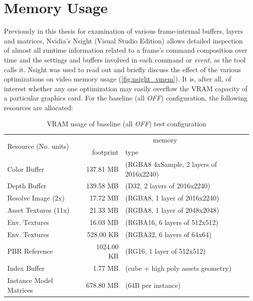 
\section{Memory Usage}
Previously in this thesis for examination of various frame-internal buffers, layers and matrices, Nvidia's Nsight (Visual Studio Edition) allows detailed inspection of almost all runtime information related to a frame's command composition over time and the settings and buffers involved in each command or \textit{event}, as the tool calls it. Nsight was used to read out and briefly discuss the effect of the various optimizations on video memory usage (\autoref{fig:nsight_vmem}). It is, after all, of interest whether any one optimization may easily overflow the VRAM capacity of a particular graphics card. 
For the baseline (all \textit{OFF}) configuration, the following resources are allocated: 

\begin{table}[H]
  \caption[VRAM usage of baseline test configuration]{VRAM usage of baseline (all \textit{OFF}) test configuration}\label{tab:vmem_baseline}
  \centering
  \begin{tabular}{l || r l }
    \toprule
  	\multirow{2}{*}{Resource (No. units)} & 
  		\multicolumn{2}{c}{memory} \\
        & {footprint} & {type} \\
    \midrule
      Color Buffer	& 137.81 MB & (RGBA8 4xSample, 2 layers of 2016x2240) \\
      Depth Buffer	& 139.58 MB & (D32, 2 layers of 2016x2240) \\
      Resolve Image (2x)	& 17.72 MB & (RGBA8, 1 layer of 2016x2240) \\
      Asset Textures (11x)	& 21.33 MB & (RGBA8, 1 layer of 2048x2048) \\
      Env. Textures	& 16.03 MB & (RGBA16, 6 layers of 512x512) \\
      Env. Textures	& 528.00 KB & (RGBA32, 6 layers of 64x64) \\
      PBR Reference	& 1024.00 KB & (RG16, 1 layer of 512x512) \\
    \midrule
      Index Buffer	& 1.77 MB & (cube + high poly assets geometry) \\
      Instance Model Matrices	& 678.80 MB & (64B per instance) \\
    \bottomrule
  \end{tabular}
\end{table} 


